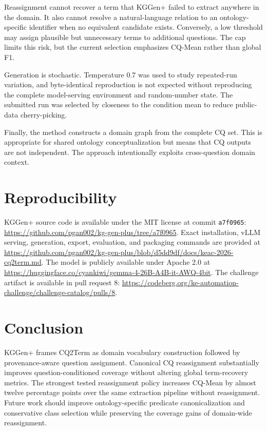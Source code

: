\documentclass{ceurart}
\begin{document}
Reassignment cannot recover a term that KGGen+ failed to extract anywhere in
the domain. It also cannot resolve a natural-language relation to an
ontology-specific identifier when no equivalent candidate exists. Conversely,
a low threshold may assign plausible but unnecessary terms to additional
questions. The cap limits this risk, but the current selection emphasizes
CQ-Mean rather than global F1.

Generation is stochastic. Temperature 0.7 was used to study repeated-run
variation, and byte-identical reproduction is not expected without reproducing
the complete model-serving environment and random-number state. The submitted
run was selected by closeness to the condition mean to reduce public-data
cherry-picking.

Finally, the method constructs a domain graph from the complete CQ set. This
is appropriate for shared ontology conceptualization but means that CQ outputs
are not independent. The approach intentionally exploits cross-question
domain context.

\section{Reproducibility}

KGGen+ source code is available under the MIT license at commit
\texttt{a7f0965}: \url{https://github.com/pgan002/kg-gen-plus/tree/a7f0965}.
Exact installation, vLLM serving, generation, export, evaluation, and packaging
commands are provided at
\url{https://github.com/pgan002/kg-gen-plus/blob/d5dd9df/docs/keac-2026-cq2term.md}.
The model is publicly available under Apache 2.0 at
\url{https://huggingface.co/cyankiwi/gemma-4-26B-A4B-it-AWQ-4bit}.
The challenge artifact is available in pull request 8:
\url{https://codeberg.org/ke-automation-challenge/challenge-catalog/pulls/8}.

\section{Conclusion}

KGGen+ frames CQ2Term as domain vocabulary construction followed by
provenance-aware question assignment. Canonical CQ reassignment substantially
improves question-conditioned coverage without altering global term-recovery
metrics. The strongest tested reassignment policy increases CQ-Mean by almost
twelve percentage points over the same extraction pipeline without
reassignment. Future work should improve ontology-specific predicate
canonicalization and conservative class selection while preserving the
coverage gains of domain-wide reassignment.
\end{document}
